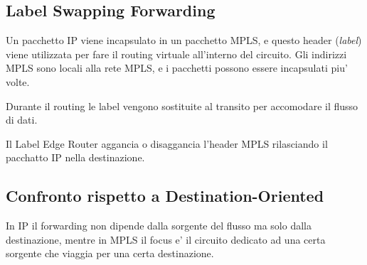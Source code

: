 
\subsection{Label Swapping Forwarding}

Un pacchetto IP viene incapsulato in un pacchetto MPLS, e questo header (\textit{label}) viene utilizzata per fare il routing virtuale all'interno del circuito.
Gli indirizzi MPLS sono locali alla rete MPLS, e i pacchetti possono essere incapsulati piu' volte.


Durante il routing le label vengono sostituite al transito per accomodare il flusso di dati.


Il Label Edge Router aggancia o disaggancia l'header MPLS rilasciando il pacchatto IP nella destinazione.


\subsection{Confronto rispetto a Destination-Oriented}

In IP il forwarding non dipende dalla sorgente del flusso ma solo dalla destinazione, mentre in MPLS il focus e' il circuito dedicato ad una certa sorgente che viaggia per una certa destinazione.


